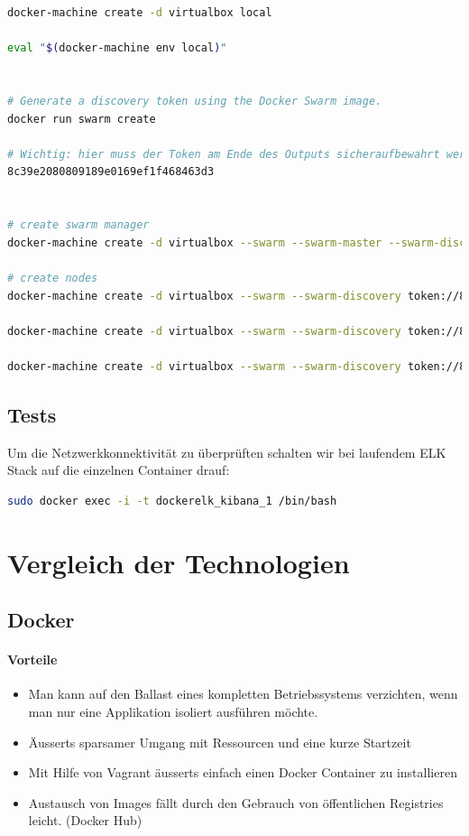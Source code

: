 \begin{lstlisting}[language=bash]
docker-machine create -d virtualbox local

eval "$(docker-machine env local)"


# Generate a discovery token using the Docker Swarm image.
docker run swarm create

# Wichtig: hier muss der Token am Ende des Outputs sicheraufbewahrt werden: 
8c39e2080809189e0169ef1f468463d3


# create swarm manager
docker-machine create -d virtualbox --swarm --swarm-master --swarm-discovery token://8c39e2080809189e0169ef1f468463d3 swarm-master

# create nodes
docker-machine create -d virtualbox --swarm --swarm-discovery token://8c39e2080809189e0169ef1f468463d3 kibana

docker-machine create -d virtualbox --swarm --swarm-discovery token://8c39e2080809189e0169ef1f468463d3 logstash

docker-machine create -d virtualbox --swarm --swarm-discovery token://8c39e2080809189e0169ef1f468463d3 elasticsearch
\end{lstlisting}


\subsection{Tests}
Um die Netzwerkkonnektivität zu überprüften schalten wir bei laufendem ELK Stack auf die einzelnen Container drauf:
\begin{lstlisting}[language=bash]
sudo docker exec -i -t dockerelk_kibana_1 /bin/bash
\end{lstlisting}

\section{Vergleich der Technologien}
\subsection{Docker}
\paragraph{Vorteile}
\begin{itemize}
	\item Man kann auf den Ballast eines kompletten Betriebssystems verzichten, wenn man nur eine Applikation isoliert ausführen möchte.
	\item Äusserts sparsamer Umgang mit Ressourcen und eine kurze Startzeit	
	\item Mit Hilfe von Vagrant äusserts einfach einen Docker Container zu installieren
	\item Austausch von Images fällt durch den Gebrauch von öffentlichen Registries leicht. (Docker Hub)
\end{itemize}
